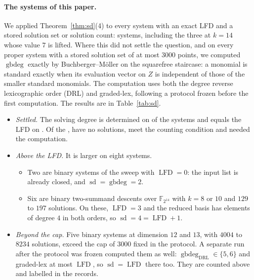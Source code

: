 \documentclass[11pt]{article}
\theoremstyle{definition}\newtheorem{definition}[theorem]{Definition}
\theoremstyle{remark}\newtheorem{remark}[theorem]{Remark}
\newcommand{\F}{\mathbb F}
\newcommand{\lfd}{\operatorname{LFD}}
\newcommand{\sd}{\operatorname{sd}}
\newcommand{\gbdeg}{\operatorname{gbdeg}}
\begin{document}
\paragraph{The systems of this paper.} We applied
Theorem~\ref{thm:sd}(4) to every system with an exact LFD and a stored
solution set or solution count: \SDSYSTEMS{} systems, including the three at
$k=14$ whose value $7$ is lifted. Where this did not settle the question,
and on every proper system with a stored solution set of at most $3000$
points, we computed $\gbdeg$ exactly by Buchberger--M\"oller on the
squarefree staircase: a monomial is standard exactly when its evaluation
vector on $Z$ is independent of those of the smaller standard monomials.
The computation uses both the degree reverse lexicographic order (DRL) and
graded-lex, following a protocol frozen before the first computation. The
results are in Table~\ref{tab:sd}.
\begin{itemize}
\item \emph{Settled.} The solving degree is determined on \SDKNOWN{} of the
 systems and equals the LFD on \SDEQUAL{}. Of the \SDKNOWN{}, \SDUNIT{} have no
 solutions, \SDCOUNT{} meet the counting condition and \SDCOMPUTED{} needed
 the computation.
\item \emph{Above the LFD.} It is larger on eight systems.
 \begin{itemize}
 \item Two are binary systems of the sweep with $\lfd=0$: the input list is
  already closed, and $\sd=\gbdeg=2$.
 \item Six are binary two-summand descents over $\F_{2^{14}}$ with $k=8$ or $10$ and $129$ to $197$ solutions. On these,
  $\lfd=3$ and the reduced basis has elements of degree $4$ in both orders,
  so $\sd=4=\lfd+1$.
 \end{itemize}
\item \emph{Beyond the cap.} Five binary systems at dimension $12$ and
 $13$, with $4004$ to $8234$ solutions, exceed the cap of $3000$ fixed in
 the protocol. A separate run after the protocol was frozen computed them
 as well: $\gbdeg_{\mathrm{DRL}}\in\{5,6\}$ and graded-lex at most
 $\lfd$, so $\sd=\lfd$ there too. They are counted above and labelled in
 the records.
\end{itemize}
\end{document}
